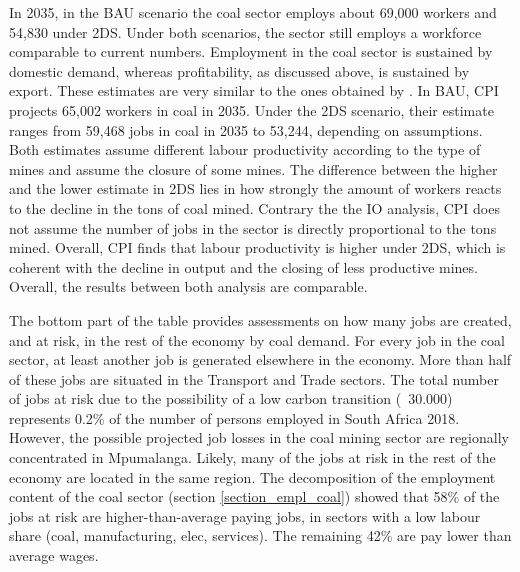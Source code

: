 \documentclass[12pt,english]{article}
\begin{document}
In 2035, in the BAU scenario the coal sector employs about 69,000 workers and 54,830 under 2DS. Under both scenarios, the sector still employs a workforce comparable to current numbers. Employment in the coal sector is sustained by domestic demand, whereas profitability, as discussed above, is sustained by export. These estimates are very similar to the ones obtained by \citep{CPI2009SA}. In BAU, CPI projects 65,002 workers in coal in 2035. Under the 2DS scenario, their estimate ranges from 59,468 jobs in coal in 2035 to 53,244, depending on assumptions. Both estimates assume different labour productivity according to the type of mines and assume the closure of some mines. The difference between the higher and the lower estimate in 2DS lies in how strongly the amount of workers reacts to the decline in the tons of coal mined. Contrary the the IO analysis, CPI does not assume the number of jobs in the sector is directly proportional to the tons mined. Overall, CPI finds that labour productivity is higher under 2DS, which is coherent with the decline in output and the closing of less productive mines. Overall, the results between both analysis are comparable. 

 
The bottom part of the table provides assessments on how many jobs are created, and at risk, in the rest of the economy by coal demand. For every job in the coal sector, at least another job is generated elsewhere in the economy. More than half of these jobs are situated in the Transport and Trade sectors. The total number of jobs at risk due to the possibility of a low carbon transition (~30.000) represents 0.2\% of the number of persons employed in South Africa 2018. However, the possible projected job losses in the coal mining sector are regionally concentrated in Mpumalanga. Likely, many of the jobs at risk in the rest of the economy are located in the same region.
The decomposition of the employment content of the coal sector (section \ref{section_empl_coal}) showed that 58\% of the jobs at risk are higher-than-average paying jobs, in sectors with a low labour share (coal, manufacturing, elec, services). The remaining 42\% are pay lower than average wages.
\end{document}
